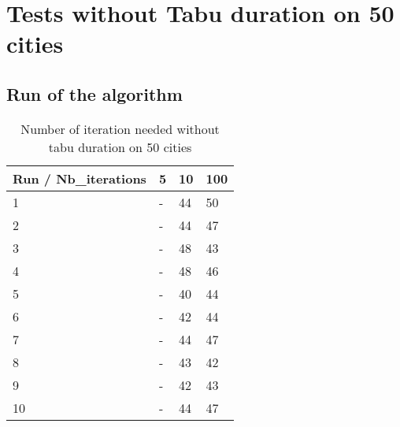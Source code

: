 \documentclass[12pt,oneside,a4paper]{article}
\begin{document}
\section{Tests without Tabu duration on 50 cities}
\paragraph{}
\subsection{Run of the algorithm}
\begin{table}[h]
    \centering
    \small
    \begin{tabular}{llll}
      \hline
      \multicolumn{1}{|l|}{\textbf{Run / Nb\_iterations}}& \multicolumn{1}{l|}{\textbf{5}} & \multicolumn{1}{l|}{\textbf{10}} & \multicolumn{1}{l|}{\textbf{100}}\\ \hline
      \multicolumn{1}{|l|}{1} & \multicolumn{1}{l|}{-}  & \multicolumn{1}{l|}{44}  & \multicolumn{1}{l|}{50}  \\ \hline
      \multicolumn{1}{|l|}{2} & \multicolumn{1}{l|}{-}  & \multicolumn{1}{l|}{44}  & \multicolumn{1}{l|}{47}  \\ \hline         
      \multicolumn{1}{|l|}{3} & \multicolumn{1}{l|}{-}  & \multicolumn{1}{l|}{48}  & \multicolumn{1}{l|}{43}  \\ \hline
      \multicolumn{1}{|l|}{4} & \multicolumn{1}{l|}{-}  & \multicolumn{1}{l|}{48}  & \multicolumn{1}{l|}{46}  \\ \hline
      \multicolumn{1}{|l|}{5} & \multicolumn{1}{l|}{-}  & \multicolumn{1}{l|}{40}  & \multicolumn{1}{l|}{44}  \\ \hline
      \multicolumn{1}{|l|}{6} & \multicolumn{1}{l|}{-}  & \multicolumn{1}{l|}{42}  & \multicolumn{1}{l|}{44}  \\ \hline
      \multicolumn{1}{|l|}{7} & \multicolumn{1}{l|}{-}  & \multicolumn{1}{l|}{44}  & \multicolumn{1}{l|}{47}  \\ \hline
      \multicolumn{1}{|l|}{8} & \multicolumn{1}{l|}{-}  & \multicolumn{1}{l|}{43}  & \multicolumn{1}{l|}{42}  \\ \hline
      \multicolumn{1}{|l|}{9} & \multicolumn{1}{l|}{-}  & \multicolumn{1}{l|}{42}  & \multicolumn{1}{l|}{43}  \\ \hline
      \multicolumn{1}{|l|}{10} & \multicolumn{1}{l|}{-}  & \multicolumn{1}{l|}{44}  & \multicolumn{1}{l|}{47}  \\ \hline
    \end{tabular}
    \caption{Number of iteration needed without tabu duration on 50 cities}
    \label{Performances scénario 0}
  \end{table}
\end{document}
